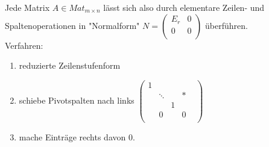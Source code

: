 \documentclass[a4paper, 12pt]{extarticle}
\begin{document}
Jede Matrix $A \in Mat_{m\times n}$ lässt sich also durch elementare Zeilen- und Spaltenoperationen in "Normalform" $N = 
\left(\begin{matrix}
E_r & 0\\
0 & 0 \\
\end{matrix} \right)$
überführen.\\
Verfahren: 
\begin{enumerate}
\item reduzierte Zeilenstufenform
\item schiebe Pivotspalten nach links 
$
\left(\begin{matrix}
1\\
& \ddots & & * &\\
& & 1 \\
& 0 & & 0 \\
\end{matrix} \right)
$
\item mache Einträge rechts davon 0.
\end{enumerate}
\end{document}
